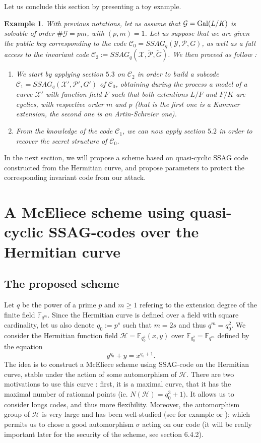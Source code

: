 \documentclass[10pt]{article}
\newtheorem{expl}{Example}[]
\newcommand{\s}{\vspace{0.3cm}}
\newcommand{\C}{\mathcal{C}}
\newcommand{\fqm}{\mathbb{F}_{q^m}}
\newcommand{\X}{\mathcal{X}}
\newcommand{\Y}{\mathcal{Y}}
\newcommand{\PR}{\mathcal{P}}
\newcommand{\G}{\mathcal{G}}
\begin{document}
Let us conclude this section by presenting a toy example.

\begin{expl} With previous notations, let us assume that $\G=\rm Gal(\it L/K)$ is solvable of order $\#\G = pm$, with $(p,m)=1$. Let us suppose that we are given the public key corresponding to the code $\C_0 = SSAG_q(\Y,\PR,G)$, as well as a full access to the invariant code $\C_2 := SSAG_q(\X,\tilde{\PR},\tilde{G})$. We then proceed as follow : 
\begin{enumerate}
\item[1.] We start by applying section $5.3$ on $\C_2$ in order to build a subcode $\C_1 = SSAG_q(\X',\PR',G')$ of $\C_0$, obtaining during the process a model of a curve $\X'$ with function field $F$ such that both extentions $L/F$ and $F/K$ are cyclics, with respective order $m$ and $p$ (that is the first one is a Kummer extension, the second one is an Artin-Schreier one).
\item[2.] From the knowledge of the code $\C_1$, we can now apply section $5.2$ in order to recover the secret structure of $\C_0$.
\end{enumerate}
\end{expl}

\s

In the next section, we will propose a scheme based on quasi-cyclic SSAG code constructed from the Hermitian curve, and propose parameters to protect the corresponding invariant code from our attack.

\s

\section{A McEliece scheme using quasi-cyclic SSAG-codes over the Hermitian curve}

\s

\subsection{The proposed scheme}

\s

Let $q$ be the power of a prime $p$ and $m \geq 1$ refering to the extension degree of the finite field $\fqm$. Since the Hermitian curve is defined over a field with square cardinality, let us also denote $q_0:=p^s$ such that $m=2s$ and thus $q^m = q_0^2$. We consider the Hermitian function field $\mathcal{H} = \mathbb{F}_{q_0^2}(x,y)$ over $\mathbb{F}_{q_0^2}=\fqm$ defined by the equation
\[y^{q_0}+y=x^{q_0+1}.\]
The idea is to construct a McEliece scheme using SSAG-code on the Hermitian curve, stable under the action of some automorphism of $\mathcal{H}$. There are two motivations to use this curve : first, it is a maximal curve, that it has the maximal number of rationnal points (ie. $N(\mathcal{H})=q_0^3+1)$. It allows us to consider longs codes, and thus more flexibility. Moreover, the automorphism group of $\mathcal{H}$ is very large and has been well-studied (see for example \cite{Sti} or \cite{Gar}); which permits us to chose a good automorphism $\sigma$ acting on our code (it will be really important later for the security of the scheme, see section 6.4.2). 
\end{document}
